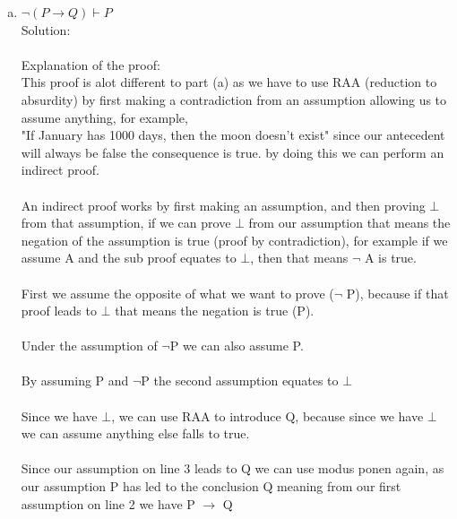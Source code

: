 \documentclass{article}
\newcommand*\moveToRight[1]{\hspace*{0em plus 1fill}\makebox{(#1)}}
\begin{document}
\begin{enumerate}[(a)]
        \item $\neg(P \to Q)\vdash P$\moveToRight{10 marks}\\
        Solution:\\
        \\
        Explanation of the proof:\\
        This proof is alot different to part (a) as we have to use RAA (reduction to absurdity) by first making a contradiction from an assumption allowing us to assume anything, for example, \\"If January has 1000 days, then the moon doesn't exist" since our antecedent will always be false the consequence is true. by doing this we can perform an indirect proof.
        \\\\An indirect proof works by first making an assumption, and then proving $\bot$ from that assumption, if we can prove $\bot$ from our assumption that means the negation of the assumption is true (proof by contradiction), for example if we assume A and the sub proof equates to $\bot$, then that means $\neg$ A is true.
        \\\\First we assume the opposite of what we want to prove ($\neg$ P), because if that proof leads to $\bot$ that means the negation is true (P). 
        \\\\Under the assumption of $\neg$P we can also assume P.
        \\\\By assuming P and $\neg$P the second assumption equates to $\bot$
        \\\\Since we have $\bot$, we can use RAA to introduce Q, because since we have $\bot$ we can assume anything else falls to true.
        \\\\Since our assumption on line 3 leads to Q we can use modus ponen again, as our assumption P has led to the conclusion Q meaning from our first assumption on line 2 we have P $\to$ Q

\end{enumerate}
\end{document}
